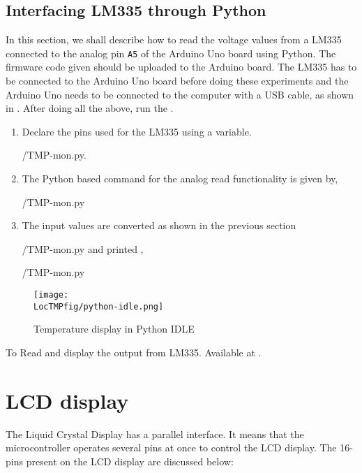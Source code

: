 \subsection{Interfacing LM335 through Python}
In this section, we shall describe how to read the voltage
values from a LM335 connected to the analog pin {\tt A5} of the
Arduino Uno board using Python. The firmware code given should
be
uploaded to the Arduino board. The LM335 has to be connected to
the Arduino Uno board before doing these experiments and the
Arduino Uno needs to be connected to the computer with a USB
cable,
as shown in . After doing all the above,
run the .

\begin{enumerate}
  \item Declare the pins used for the LM335 using a variable.

        {\LocTMPpycode/TMP-mon.py}.
        
\item The Python based command for the analog read functionality
is given by,

        {\LocTMPpycode/TMP-mon.py}

\item The input values are converted as shown in the previous
section

        {\LocTMPpycode/TMP-mon.py} and printed ,

        {\LocTMPpycode/TMP-mon.py}
\end{enumerate}

\begin{figure}[htp]
  \centering
\texttt{[image: \\LocTMPfig/python-idle.png]}  \caption{Temperature display in Python IDLE}
\end{figure}

\begin{pycode}
  {To Read and display the output from LM335. Available at
    .}
  \label{py:lm335}
  
\end{pycode}


\section{LCD display}
The Liquid Crystal Display has a parallel interface. It means
that the microcontroller operates several pins at once to
control the LCD display.
The 16-pins present on the LCD display are discussed below:

